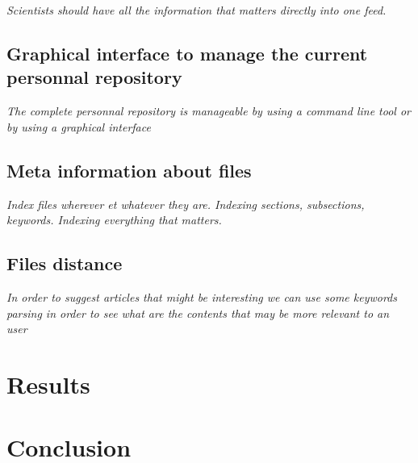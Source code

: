 \textit{Scientists should have all the information that matters directly into
one feed.}

\subsection{Graphical interface to manage the current personnal repository}

\textit{The complete personnal repository is manageable by using a command line
tool or by using a graphical interface}

\subsection{Meta information about files}

\textit{Index files wherever et whatever they are. Indexing sections, subsections,
keywords. Indexing everything that matters.}

\subsection{Files distance}

\textit{In order to suggest articles that might be interesting we can use
some keywords parsing in order to see what are the contents that may be more
relevant to an user}

\section{Results}

\section{Conclusion}

